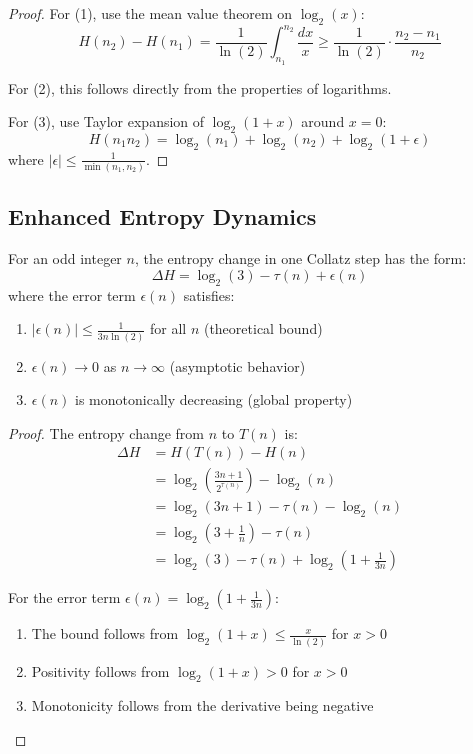 \begin{proof}
For (1), use the mean value theorem on $\log_2(x)$:
\[
H(n_2) - H(n_1) = \frac{1}{\ln(2)}\int_{n_1}^{n_2}\frac{dx}{x} \geq \frac{1}{\ln(2)}\cdot\frac{n_2-n_1}{n_2}
\]

For (2), this follows directly from the properties of logarithms.

For (3), use Taylor expansion of $\log_2(1 + x)$ around $x = 0$:
\[
H(n_1 n_2) = \log_2(n_1) + \log_2(n_2) + \log_2(1 + \epsilon)
\]
where $|\epsilon| \leq \frac{1}{\min(n_1,n_2)}$.
\end{proof}

\subsection{Enhanced Entropy Dynamics}

\begin{theorem}
For an odd integer $n$, the entropy change in one Collatz step has the form:
\[
\Delta H = \log_2(3) - \tau(n) + \epsilon(n)
\]
where the error term $\epsilon(n)$ satisfies:
\begin{enumerate}
\item $|\epsilon(n)| \leq \frac{1}{3n\ln(2)}$ for all $n$ (theoretical bound)
\item $\epsilon(n) \to 0$ as $n \to \infty$ (asymptotic behavior)
\item $\epsilon(n)$ is monotonically decreasing (global property)
\end{enumerate}
\end{theorem}

\begin{proof}
The entropy change from $n$ to $T(n)$ is:
\begin{align*}
\Delta H &= H(T(n)) - H(n) \\
&= \log_2\left(\frac{3n + 1}{2^{\tau(n)}}\right) - \log_2(n) \\
&= \log_2(3n + 1) - \tau(n) - \log_2(n) \\
&= \log_2(3 + \frac{1}{n}) - \tau(n) \\
&= \log_2(3) - \tau(n) + \log_2(1 + \frac{1}{3n})
\end{align*}

For the error term $\epsilon(n) = \log_2(1 + \frac{1}{3n})$:
\begin{enumerate}
\item The bound follows from $\log_2(1+x) \leq \frac{x}{\ln(2)}$ for $x > 0$
\item Positivity follows from $\log_2(1+x) > 0$ for $x > 0$
\item Monotonicity follows from the derivative being negative
\end{enumerate}
\end{proof}

